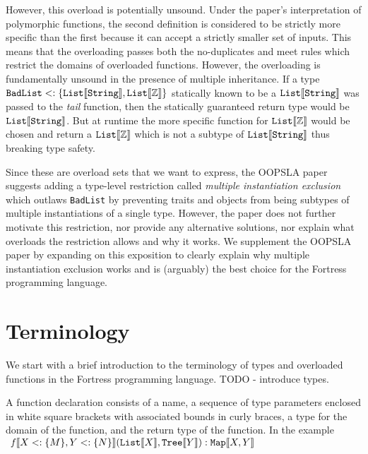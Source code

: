 \documentclass[preprint]{sigplanconf}
\newcommand{\ob}[1]{\ensuremath{\llbracket {#1} \rrbracket}}
\begin{document}
However, this overload is potentially unsound.  Under the paper's interpretation of polymorphic functions, 
the second definition is considered to be strictly more specific than the first because it can accept a strictly 
smaller set of inputs.  This means that the overloading passes both the no-duplicates and meet rules 
which restrict the domains of overloaded functions.  However, the overloading is fundamentally unsound 
in the presence of multiple inheritance. If a type ${\tt BadList} <: \{ {\tt List}\ob{{\tt String}},{\tt List}\ob{\mathbb{Z}}\}$ 
statically known to be a  ${\tt List}\ob{{\tt String}}$ was passed to the {\it tail} function, then the statically 
guaranteed return type would be ${\tt List}\ob{{\tt String}}$. But at runtime the more specific function for 
${\tt List}\ob{\mathbb{Z}}$ would be chosen and return a ${\tt List}\ob{\mathbb{Z}}$ which is not a subtype 
of ${\tt List}\ob{{\tt String}}$ thus breaking type safety.

Since these are overload sets that we want to express, the OOPSLA paper suggests adding a type-level 
restriction called {\it multiple instantiation exclusion}
which outlaws {\tt BadList} by preventing traits and objects from being subtypes of multiple instantiations
of a single type.  However, the paper does not further motivate this restriction, nor provide any
alternative solutions, nor explain what overloads the restriction allows and why it works.  We supplement
the OOPSLA paper by expanding on this exposition to clearly explain why multiple instantiation 
exclusion works and is (arguably) the best choice for the Fortress programming language.

\section{Terminology}

We start with a brief introduction to the terminology of types and overloaded functions in the 
Fortress programming language. TODO - introduce types.

A function declaration consists of a name, a sequence of type parameters enclosed in white square brackets 
with associated bounds in curly braces, a type for the domain of the function, and the return type of the function. 
In the example\\

$\begin{array}{l}
{\it f}\ob{X<: \{M\}, Y<:\{N\}}({\tt List}\ob{X}, {\tt Tree}\ob{Y}) : {\tt Map}\ob{X,Y} \\
\end{array}$\\
\end{document}
